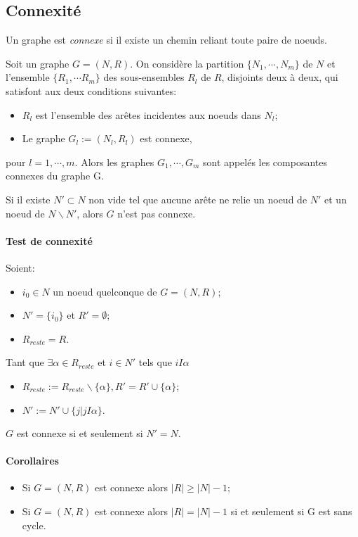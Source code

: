 \subsection{Connexité}
Un graphe est \emph{connexe}
si il existe un chemin reliant toute paire de noeuds.

Soit un graphe $G = (N, R)$.
On considère la partition $\{N_1, \cdots , N_m\}$ de $N$
et l'ensemble $\{R_1, \cdots R_m\}$ des sous-ensembles $R_l$ de $R$,
disjoints deux à deux, qui satisfont aux deux conditions suivantes:
\begin{itemize}
  \item $R_l$ est l'ensemble des arêtes incidentes aux noeuds dans $N_l$;
  \item Le graphe $G_l := (N_l, R_l)$ est connexe,
\end{itemize}
pour $l = 1, \cdots , m$. Alors les graphes $G_1, \cdots , G_m$
sont appelés les composantes connexes du graphe G.

Si il existe $N' \subset N$ non vide tel que aucune arête ne relie
un noeud de $N'$ et un noeud de $N\backslash N'$, alors $G$ n'est pas connexe.

\paragraph{Test de connexité}
Soient:
\begin{itemize}
  \item $i_0 \in N$ un noeud quelconque de $G = (N,R)$;
  \item $N' = \{i_0\}$ et $R' = \emptyset$;
  \item $R_{reste} = R$.
\end{itemize}
Tant que $\exists \alpha \in R_{reste}$ et $i \in N'$ tels que $iI\alpha$
\begin{itemize}
  \item $R_{reste} := R_{reste}\backslash \{\alpha\},
    R' = R' \cup \{\alpha\}$;
  \item $N' := N' \cup \{j | jI\alpha\}$.
\end{itemize}
$G$ est connexe si et seulement si $N' = N$.

\paragraph{Corollaires}
\begin{itemize}
  \item Si $G = (N,R)$ est connexe alors $|R| \geq |N| - 1$;
  \item Si $G = (N,R)$ est connexe alors $|R| = |N| - 1$
    si et seulement si G est sans cycle.
\end{itemize}

